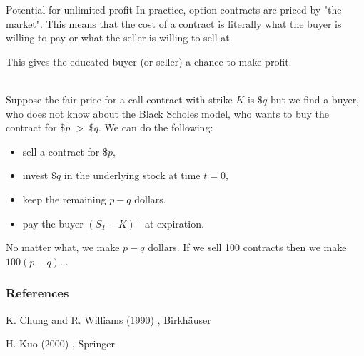 \documentclass{beamer}%
\numberwithin{equation}{section}
\begin{document}
	\begin{frame}{Potential for unlimited profit}
In practice, option contracts are priced by "the market". This means that the cost of a contract is literally what the buyer is willing to pay or what the seller is willing to sell at. 

\vspace{.1in}

This gives the educated buyer (or seller) a chance to make profit. 

\vspace{.1in}\\

Suppose the fair price for a call contract with strike $K$ is $\$q$ but we find a buyer, who does not know about the Black Scholes model, who wants to buy the contract for $\$p \; > \; \$q$. We can do the following:
	\begin{itemize}
		\item sell a contract for $\$p$,
		\item invest $\$q$ in the underlying stock at time $t=0$,
		\item keep the remaining $p-q$ dollars.
		\item pay the buyer $(S_T -K)^+$ at expiration.
	\end{itemize}
No matter what, we make $p - q$ dollars. If we sell 100 contracts then we make $100(p-q)$...
	\end{frame}


	\begin{frame}
		\frametitle{References}
		\small
		
		\begin{thebibliography}{999}
			K. Chung and R. Williams (1990)
			, Birkh\"auser
			
			H. Kuo (2000)
			, Springer
		\end{thebibliography}
	\end{frame}
\end{document}
